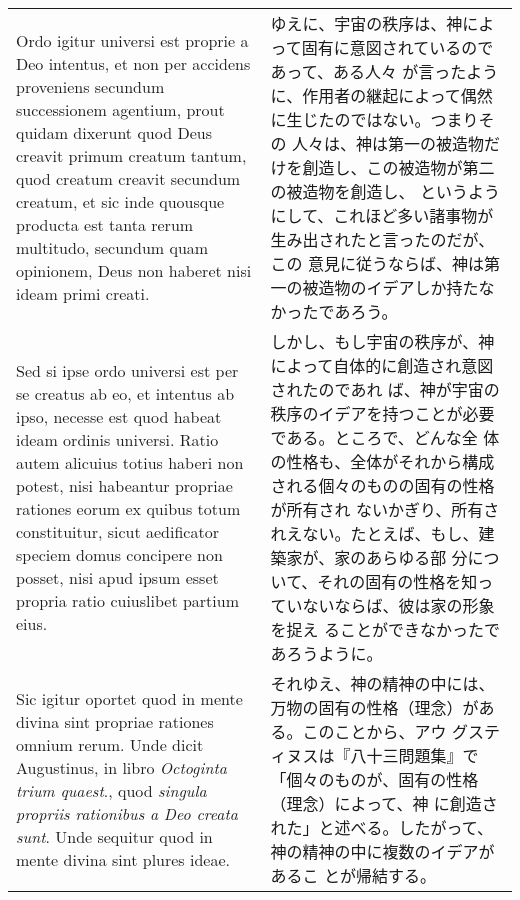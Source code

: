 \documentclass[10pt]{jsarticle} %
\begin{document}
\begin{longtable}{p{21em}p{21em}}
\\

Ordo igitur universi est proprie a Deo intentus, et non per
accidens proveniens secundum successionem agentium, prout quidam
dixerunt quod Deus creavit primum creatum tantum, quod creatum creavit
secundum creatum, et sic inde quousque producta est tanta rerum
multitudo, secundum quam opinionem, Deus non haberet nisi ideam primi
creati. 


&

ゆえに、宇宙の秩序は、神によって固有に意図されているのであって、ある人々
が言ったように、作用者の継起によって偶然に生じたのではない。つまりその
人々は、神は第一の被造物だけを創造し、この被造物が第二の被造物を創造し、
というようにして、これほど多い諸事物が生み出されたと言ったのだが、この
意見に従うならば、神は第一の被造物のイデアしか持たなかったであろう。

\\

Sed si ipse ordo universi est per se creatus ab eo, et intentus ab
ipso, necesse est quod habeat ideam ordinis universi. Ratio autem
alicuius totius haberi non potest, nisi habeantur propriae rationes
eorum ex quibus totum constituitur, sicut aedificator speciem domus
concipere non posset, nisi apud ipsum esset propria ratio cuiuslibet
partium eius.

&

しかし、もし宇宙の秩序が、神によって自体的に創造され意図されたのであれ
 ば、神が宇宙の秩序のイデアを持つことが必要である。ところで、どんな全
 体の性格も、全体がそれから構成される個々のものの固有の性格が所有され
 ないかぎり、所有されえない。たとえば、もし、建築家が、家のあらゆる部
 分について、それの固有の性格を知っていないならば、彼は家の形象を捉え
 ることができなかったであろうように。

\\

Sic igitur oportet quod in mente divina sint propriae rationes omnium
rerum. Unde dicit Augustinus, in libro {\itshape Octoginta trium
quaest}., quod {\itshape singula propriis rationibus a Deo creata
sunt}. Unde sequitur quod in mente divina sint plures ideae.

&

それゆえ、神の精神の中には、万物の固有の性格（理念）がある。このことから、アウ
グスティヌスは『八十三問題集』で「個々のものが、固有の性格（理念）によって、神
に創造された」と述べる。したがって、神の精神の中に複数のイデアがあるこ
とが帰結する。

\\


\end{longtable}
\end{document}
